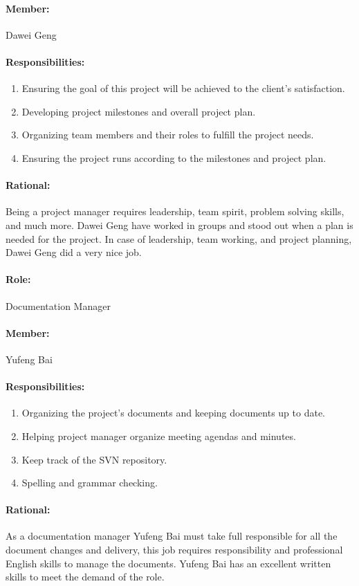 \documentclass[11pt, a4paper]{report}
\begin{document}
\paragraph{Member: } Dawei Geng
\paragraph{Responsibilities: }
\begin{enumerate}
	\item  Ensuring the goal of this project will be achieved to the client's satisfaction.
	\item  Developing project milestones and overall project plan.
	\item  Organizing team members and their roles to fulfill the project needs.
	\item  Ensuring the project runs according to the milestones and project plan.
\end{enumerate}
\paragraph{Rational: \\} 
Being a project manager requires leadership, team spirit, problem solving skills, and much more. Dawei Geng have worked in groups and stood out when a plan is needed for the project. In case of leadership, team working, and project planning, Dawei Geng did a very nice job. 

\paragraph{Role: } Documentation Manager
\paragraph{Member: } Yufeng Bai
\paragraph{Responsibilities: }
\begin{enumerate}
	\item  Organizing the project's documents and keeping documents up to date.
	\item  Helping project manager organize meeting agendas and minutes.
	\item  Keep track of the SVN repository.
	\item  Spelling and grammar checking.
\end{enumerate}
\paragraph{Rational: \\}
As a documentation manager Yufeng Bai must take full responsible for all the document changes and delivery, this job requires responsibility and professional English skills to manage the documents. Yufeng Bai has an excellent written skills to meet the demand of the role.
\end{document}
